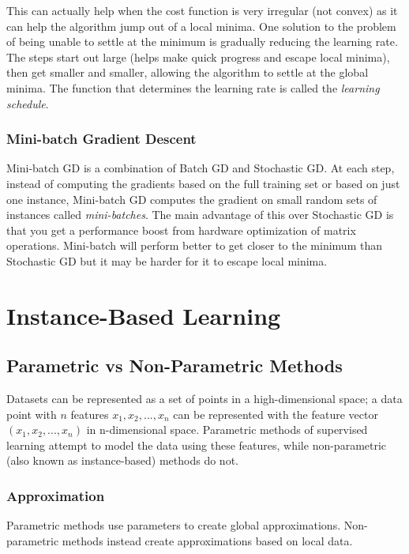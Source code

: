 \documentclass[12pt]{article}
\begin{document}
            This can actually help when the cost function is very irregular (not convex) as it can help the algorithm jump out of a local minima. One solution to the problem of being unable to settle at the minimum 
            is gradually reducing the learning rate. The steps start out large (helps make quick progress and escape local minima), then get smaller and smaller, allowing the algorithm to settle at the global minima.
            The function that determines the learning rate is called the \textit{learning schedule}.
        
        \subsubsection{Mini-batch Gradient Descent}
            Mini-batch GD is a combination of Batch GD and Stochastic GD. At each step, instead of computing the gradients based on the full training set or based on just one instance, Mini-batch GD computes the gradient on small random sets of instances 
            called \textit{mini-batches}. The main advantage of this over Stochastic GD is that you get a performance boost from hardware optimization of matrix operations. Mini-batch will perform better to get closer to the minimum than Stochastic GD but it 
            may be harder for it to escape local minima.
    
\section{Instance-Based Learning}
    \subsection{Parametric vs Non-Parametric Methods}
        Datasets can be represented as a set of points in a high-dimensional space; a data point with $n$ features $x_1, x_2, ..., x_n$ can be represented
        with the feature vector $(x_1, x_2, ..., x_n)$ in n-dimensional space. Parametric methods of supervised learning attempt to model the data using
        these features, while non-parametric (also known as instance-based) methods do not.

        \subsubsection{Approximation}
            Parametric methods use parameters to create global approximations. Non-parametric methods instead create approximations based on local data.
\end{document}
